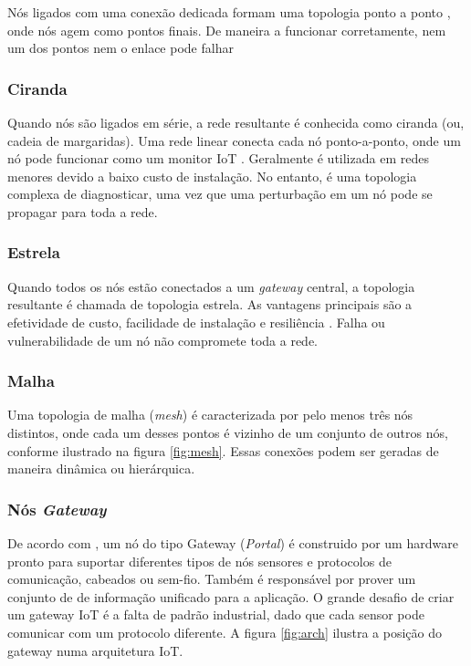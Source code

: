 \documentclass[tcc,capa]{texufpel}
\begin{document}
Nós ligados com uma conexão dedicada formam uma topologia ponto a ponto \cite{schiller}, onde nós agem como pontos finais. De maneira a funcionar  corretamente, nem um dos pontos nem o enlace pode falhar

\subsubsection{Ciranda}

Quando nós são ligados em série, a rede resultante é conhecida como ciranda (ou, cadeia de margaridas). Uma rede linear conecta cada nó ponto-a-ponto, onde um nó pode funcionar como um monitor IoT \cite{schiller}.  Geralmente é utilizada em redes menores devido a baixo custo de instalação. No entanto, é uma topologia complexa de diagnosticar, uma vez que uma perturbação em um nó pode se propagar para toda a rede.

\subsubsection{Estrela}

Quando todos os nós estão conectados a um \textit{gateway} central, a topologia resultante é chamada de topologia estrela. As vantagens principais são a efetividade de custo, facilidade de instalação e resiliência \cite{schiller}. Falha ou vulnerabilidade de um nó não compromete toda a rede.

\subsubsection{Malha}

Uma topologia de malha (\textit{mesh}) é caracterizada por pelo menos três nós distintos, onde cada um desses pontos é vizinho de um conjunto de outros nós, conforme ilustrado na figura \ref{fig:mesh}. Essas conexões podem ser geradas de maneira dinâmica ou hierárquica.

\subsubsection{Nós \textit{Gateway}}

De acordo com \citet{gloria2017design}, um nó do tipo Gateway (\textit{Portal}) é construido por um hardware pronto para suportar diferentes tipos de nós sensores e protocolos de
comunicação, cabeados ou sem-fio. Também é responsável por prover um conjunto de de informação unificado para a aplicação. O grande desafio de criar um gateway IoT é a falta de
padrão industrial, dado que cada sensor pode comunicar com um protocolo diferente. A figura \ref{fig:arch} ilustra a posição do gateway numa arquitetura IoT.
\end{document}

